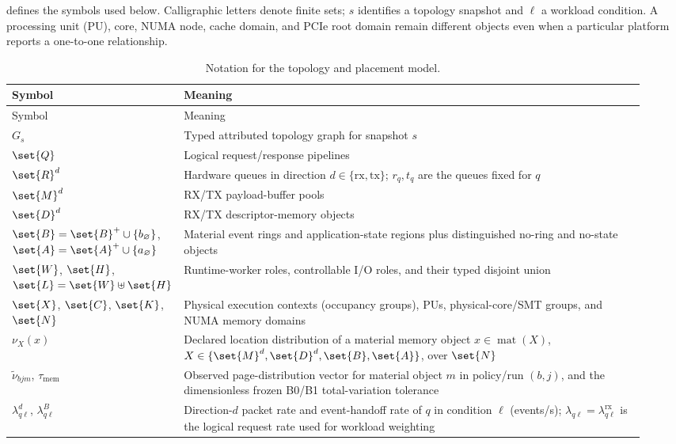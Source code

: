  defines the symbols used below. Calligraphic letters denote finite sets; $s$ identifies a topology snapshot and $\ell$ a workload condition. A processing unit (PU), core, NUMA node, cache domain, and PCIe root domain remain different objects even when a particular platform reports a one-to-one relationship.

\begin{longtable}{@{}p{0.20\linewidth}p{0.73\linewidth}@{}}
\caption{Notation for the topology and placement model.}\label{tab:notation}\\
\toprule
Symbol & Meaning \\
\midrule
\endfirsthead
\toprule
Symbol & Meaning \\
\midrule
\endhead
$G_s$ & Typed attributed topology graph for snapshot $s$ \\
$\set{Q}$ & Logical request/response pipelines \\
$\set{R}^{d}$ & Hardware queues in direction $d\in\{\mathrm{rx},\mathrm{tx}\}$; $r_q,t_q$ are the queues fixed for $q$ \\
$\set{M}^{d}$ & RX/TX payload-buffer pools \\
$\set{D}^{d}$ & RX/TX descriptor-memory objects \\
$\set{B}=\set{B}^{+}\cup\{b_\varnothing\}$, $\set{A}=\set{A}^{+}\cup\{a_\varnothing\}$ & Material event rings and application-state regions plus distinguished no-ring and no-state objects \\
$\set{W}$, $\set{H}$, $\set{L}=\set{W}\uplus\set{H}$ & Runtime-worker roles, controllable I/O roles, and their typed disjoint union \\
$\set{X}$, $\set{C}$, $\set{K}$, $\set{N}$ & Physical execution contexts (occupancy groups), PUs, physical-core/SMT groups, and NUMA memory domains \\
$\nu_X(x)$ & Declared location distribution of a material memory object $x\in\operatorname{mat}(X)$, $X\in\{\set{M}^{d},\set{D}^{d},\set{B},\set{A}\}$, over $\set{N}$ \\
$\widetilde\nu_{bjm}$, $\tau_{\mathrm{mem}}$ & Observed page-distribution vector for material object $m$ in policy/run $(b,j)$, and the dimensionless frozen B0/B1 total-variation tolerance \\
$\lambda^d_{q\ell}$, $\lambda^B_{q\ell}$ & Direction-$d$ packet rate and event-handoff rate of $q$ in condition $\ell$ (events/s); $\lambda_{q\ell}=\lambda^{\mathrm{rx}}_{q\ell}$ is the logical request rate used for workload weighting \\

\end{longtable}
